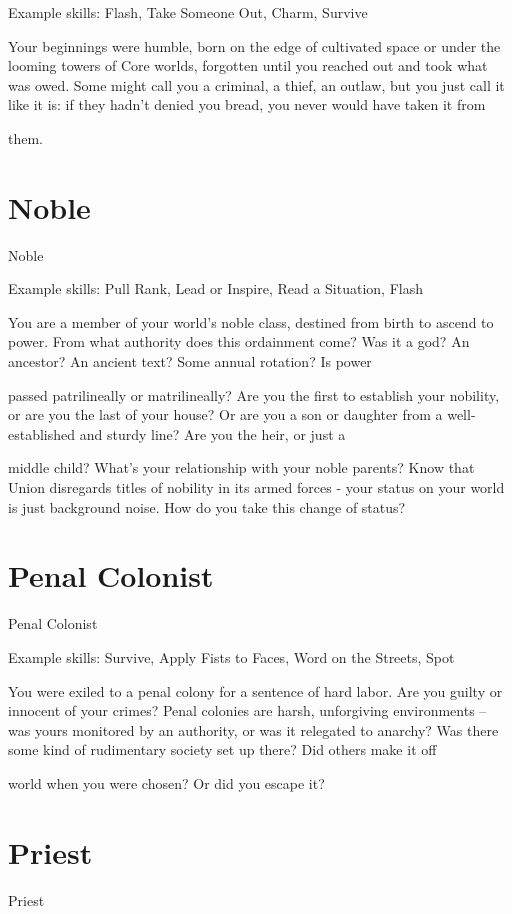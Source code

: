 Example skills: Flash, Take Someone Out, Charm, Survive

Your beginnings were humble, born on the edge of cultivated space or under the looming towers of Core
worlds, forgotten until you reached out and took what was owed. Some might call you a criminal, a thief, an
outlaw, but you just call it like it is: if they hadn’t denied you bread, you never would have taken it from

them.
\section{Noble}
                                                        Noble

Example skills: Pull Rank, Lead or Inspire, Read a Situation, Flash

You are a member of your world’s noble class, destined from birth to ascend to power. From what authority
does this ordainment come? Was it a god? An ancestor? An ancient text? Some annual rotation? Is power

passed patrilineally or matrilineally? Are you the first to establish your nobility, or are you the last of your
house? Or are you a son or daughter from a well-established and sturdy line? Are you the heir, or just a

middle child? What’s your relationship with your noble parents? Know that Union disregards titles of
nobility in its armed forces - your status on your world is just background noise. How do you take this
change of status?
 \section{Penal Colonist}

                                                 Penal Colonist

Example skills: Survive, Apply Fists to Faces, Word on the Streets, Spot


You were exiled to a penal colony for a sentence of hard labor. Are you guilty or innocent of your crimes?
Penal colonies are harsh, unforgiving environments -- was yours monitored by an authority, or was it
relegated to anarchy? Was there some kind of rudimentary society set up there? Did others make it off

world when you were chosen? Or did you escape it?

\section{Priest}
                                                        Priest

